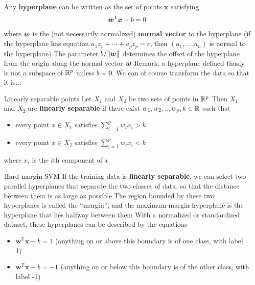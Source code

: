 \documentclass[aspectratio=169]{beamer}\usepackage[]{graphicx}\usepackage[]{xcolor}
\begin{document}
\begin{frame}
    Any \textbf{hyperplane} can be written as the set of points $\mathbf{x}$ satisfying
    \[
        \bm{w}^\mathsf{T} \bm{x} - b = 0
    \]
    where $\bm{w}$ is the (not necessarily normalized) \textbf{normal vector} to the hyperplane (if the hyperplane has equation $a_1z_1+\cdots+a_pz_p=c$, then $(a_1,\ldots,a_n)$ is normal to the hyperplane)
    \vfill
    The parameter $b/\|\bm{w}\|$ determines the offset of the hyperplane from the origin along the normal vector $\bm{w}$
    \vfill
    Remark: a hyperplane defined thusly is not a subspace of $\mathbb{R}^p$ unless $b=0$. We can of course transform the data so that it is...
\end{frame}

\begin{frame}{Linearly separable points}
    Let $X_1$ and $X_2$ be two sets of points in $\mathbb{R}^p$ 
    \vfill
    Then $X_1$ and $X_2$ are \textbf{linearly separable} if there exist $w_{1}, w_{2},..,w_{p}, k\in\mathbb{R}$ such that 
    \begin{itemize}
        \item every point $x \in X_1$ satisfies $\sum^{p}_{i=1} w_{i}x_{i} > k$ 
        \item every point $x \in X_2$ satisfies $\sum^{p}_{i=1} w_{i}x_{i} < k$
    \end{itemize}
    where $x_{i}$ is the $i$th component of $x$
\end{frame}

\begin{frame}{Hard-margin SVM}
    If the training data is \textbf{linearly separable}, we can select two parallel hyperplanes that separate the two classes of data, so that the distance between them is as large as possible 
    \vfill
    The region bounded by these two hyperplanes is called the ``margin'', and the maximum-margin hyperplane is the hyperplane that lies halfway between them
    \vfill
    With a normalized or standardized dataset, these hyperplanes can be described by the equations
    \begin{itemize}
        \item $\mathbf{w}^\mathsf{T} \mathbf{x} - b = 1$ (anything on or above this boundary is of one class, with label 1) 
        \item $\mathbf{w}^\mathsf{T} \mathbf{x} - b = -1$ (anything on or below this boundary is of the other class, with label -1)
    \end{itemize}
\end{frame}
\end{document}
